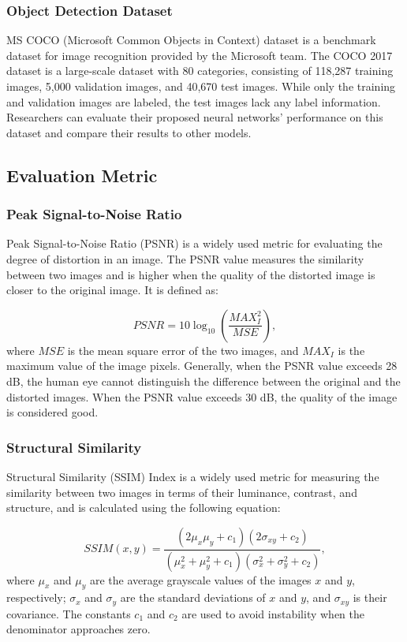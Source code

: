 \documentclass[default,iicol]{sn-jnl}
\theoremstyle{thmstyleone}\newtheorem{theorem}{Theorem}\newtheorem{proposition}[theorem]{Proposition}
\theoremstyle{thmstyletwo}\newtheorem{example}{Example}\newtheorem{remark}{Remark}\theoremstyle{thmstylethree}\newtheorem{definition}{Definition}
\begin{document}
\subsubsection{Object Detection Dataset}
MS COCO (Microsoft Common Objects in Context) dataset \cite{lin2014microsoft} is a benchmark dataset for image recognition provided by the Microsoft team. The COCO 2017 dataset is a large-scale dataset with 80 categories, consisting of 118,287 training images, 5,000 validation images, and 40,670 test images. While only the training and validation images are labeled, the test images lack any label information. Researchers can evaluate their proposed neural networks' performance on this dataset and compare their results to other models.

\subsection{Evaluation Metric}
\subsubsection{Peak Signal-to-Noise Ratio}
Peak Signal-to-Noise Ratio (PSNR) is a widely used metric for evaluating the degree of distortion in an image. The PSNR value measures the similarity between two images and is higher when the quality of the distorted image is closer to the original image. It is defined as:

\begin{equation}
PSNR=10 \log _{10}\left(\frac{MAX_{I}^{2}}{MSE}\right),
\end{equation}
where $MSE$ is the mean square error of the two images, and $MAX_I$ is the maximum value of the image pixels. Generally, when the PSNR value exceeds 28 dB, the human eye cannot distinguish the difference between the original and the distorted images. When the PSNR value exceeds 30 dB, the quality of the image is considered good.

\subsubsection{Structural Similarity}
Structural Similarity (SSIM) Index is a widely used metric for measuring the similarity between two images in terms of their luminance, contrast, and structure, and is calculated using the following equation:

\begin{equation}
SSIM(x,y) = \frac{(2\mu_x\mu_y+c_1)(2\sigma_{xy}+c_2)}{(\mu_x^2+\mu_y^2+c_1)(\sigma_x^2+\sigma_y^2+c_2)},
\end{equation}
where $\mu_x$ and $\mu_y$ are the average grayscale values of the images $x$ and $y$, respectively; $\sigma_x$ and $\sigma_y$ are the standard deviations of $x$ and $y$, and $\sigma_{xy}$ is their covariance. The constants $c_1$ and $c_2$ are used to avoid instability when the denominator approaches zero.
\end{document}
